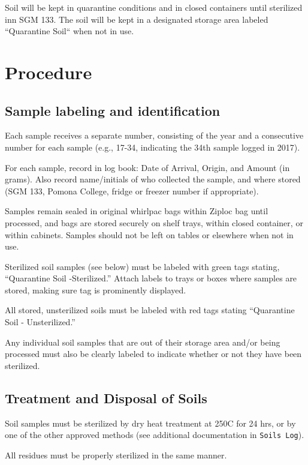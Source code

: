 \documentclass[12pt]{../SOP3}\usepackage[]{graphicx}\usepackage[]{color}
\begin{document}
\NP Soil will be kept in quarantine conditions and in closed containers until sterilized inn SGM 133. The soil will be kept in a designated storage area labeled ``Quarantine Soil`` when not in use.

\section{Procedure}

\subsection{Sample labeling and identification}

\NP Each sample receives a separate number, consisting of the year and a consecutive number for each sample (e.g., 17-34, indicating the 34th sample logged in 2017).

\NP For each sample, record in log book: Date of Arrival, Origin, and Amount (in grams). Also record name/initials of who collected the sample, and where stored (SGM 133, Pomona College, fridge or freezer number if appropriate). 

\NP Samples remain sealed in original whirlpac bags within Ziploc bag until processed, and bags are stored securely on shelf trays, within closed container, or within cabinets. Samples should not be left on tables or elsewhere when not in use.

\NP Sterilized soil samples (see below) must be labeled with green tags stating, ``Quarantine Soil -Sterilized.'' Attach labels to trays or boxes where samples are stored, making sure tag is prominently displayed.

\NP All stored, unsterilized soils must be labeled with red tags stating ``Quarantine Soil - Unsterilized.''

\NP Any individual soil samples that are out of their storage area and/or being processed must also be clearly labeled to indicate whether or not they have been sterilized.


\subsection{Treatment and Disposal of Soils}

\NP Soil samples must be sterilized by dry heat treatment at 250\degree C for 24 hrs, or by one of the other approved methods (see additional documentation in \texttt{Soils Log}).

\NP All residues must be properly sterilized in the same manner.
\end{document}
